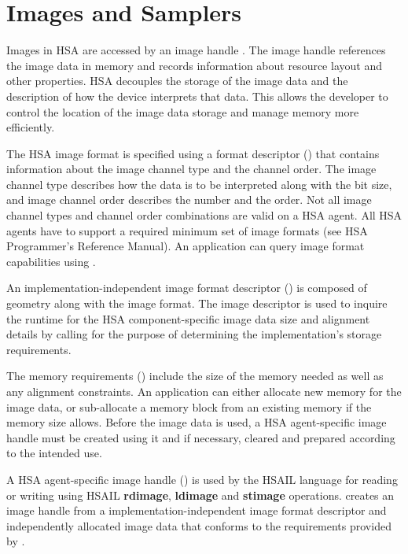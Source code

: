 \documentclass[draft]{book}
\newcommand{\reffun}[1]{\textbf{#1}}
\newcommand{\refhsl}[1]{\reffun{#1}}
\begin{document}
\section{Images and Samplers}
\label{images} \hypertarget{images}{}

Images in HSA are accessed by an image handle . The
image handle references the image data in memory and records information about
resource layout and other properties. HSA decouples the storage of the image
data and the description of how the device interprets that data. This allows the
developer to control the location of the image data storage and manage memory
more efficiently.

The HSA image format is specified using a format descriptor
() that contains information about the image channel
type and the channel order. The image channel type describes how the data is to
be interpreted along with the bit size, and image channel order describes the
number and the order. Not all image channel types and channel order combinations
are valid on a HSA agent. All HSA agents have to support a required minimum set
of image formats (see HSA Programmer's Reference Manual). An application can
query image format capabilities using .

An implementation-independent image format descriptor
() is composed of geometry along with the
image format. The image descriptor is used to inquire the runtime for the HSA
component-specific image data size and alignment details by calling
 for the purpose of determining the
implementation's storage requirements.

The memory requirements () include the size of the
memory needed as well as any alignment constraints. An application can either
allocate new memory for the image data, or sub-allocate a memory block from an
existing memory if the memory size allows. Before the image data is used, a HSA
agent-specific image handle must be created using it and if necessary, cleared
and prepared according to the intended use.

A HSA agent-specific image handle () is used by the
HSAIL language for reading or writing using HSAIL \refhsl{rdimage},
\refhsl{ldimage} and \refhsl{stimage}
operations.  creates an image handle from a
implementation-independent image format descriptor and independently allocated
image data that conforms to the requirements provided by
.
\end{document}
